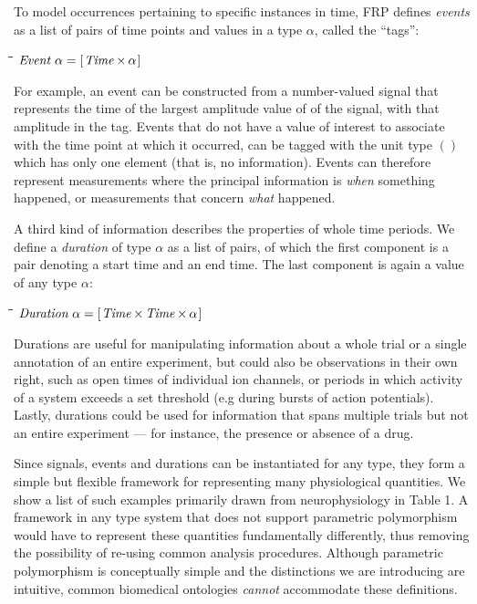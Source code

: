 \documentclass[11pt]{article}
\newlength{\lwidth}\setlength{\lwidth}{4.5cm}
\newlength{\cwidth}\setlength{\cwidth}{8mm} %
\newcommand{\Conid}[1]{\mathit{#1}}
\begin{document}
To model occurrences pertaining to specific instances in time,
FRP defines \emph{events} as a list of pairs of time points and values in a
type \ensuremath{\alpha}, called the ``tags'':
\begin{tabbing}
\qquad\=\hspace{\lwidth}\=\hspace{\cwidth}\=\+\kill
${\Conid{Event}\;\alpha\mathrel{=}[\mskip1.5mu \Conid{Time}\;\!\!\times\!\!\;\alpha\mskip1.5mu]}$
\end{tabbing}For example, an event can be constructed from a number-valued signal
that represents the time of the largest amplitude value of of the
signal, with that amplitude in the tag. Events that do not have a
value of interest to associate with the time point at which it
occurred, can be tagged with the unit type \ensuremath{()} which has only one
element (that is, no information). Events can therefore represent
measurements where the principal information is \emph{when} something
happened, or measurements that concern \emph{what} happened.

A third kind of information describes the properties of whole time
periods. We define a \emph{duration} of type \ensuremath{\alpha} as a list of pairs, of
which the first component is a pair denoting a start time and an end
time. The last component is again a value of any type \ensuremath{\alpha}:
\begin{tabbing}
\qquad\=\hspace{\lwidth}\=\hspace{\cwidth}\=\+\kill
${\Conid{Duration}\;\alpha\mathrel{=}[\mskip1.5mu \Conid{Time}\;\!\!\times\!\!\;\Conid{Time}\;\!\!\times\!\!\;\alpha\mskip1.5mu]}$
\end{tabbing}Durations are useful for manipulating information about a whole trial
or a single annotation of an entire experiment, but could also be
observations in their own right, such as open times of individual ion
channels, or periods in which activity of a system exceeds a set
threshold (e.g during bursts of action potentials). Lastly, durations
could be used for information that spans multiple trials but not an
entire experiment --- for instance, the presence or absence of a drug.

Since signals, events and durations can be instantiated for any type,
they form a simple but flexible framework for representing many
physiological quantities. We show a list of such examples primarily
drawn from neurophysiology in Table 1. A framework in any type system
that does not support parametric polymorphism would have to represent
these quantities fundamentally differently, thus removing the
possibility of re-using common analysis procedures. Although
parametric polymorphism is conceptually simple and the distinctions we
are introducing are intuitive, common biomedical
ontologies \citep{owlref} \emph{cannot} accommodate these definitions.
\end{document}

